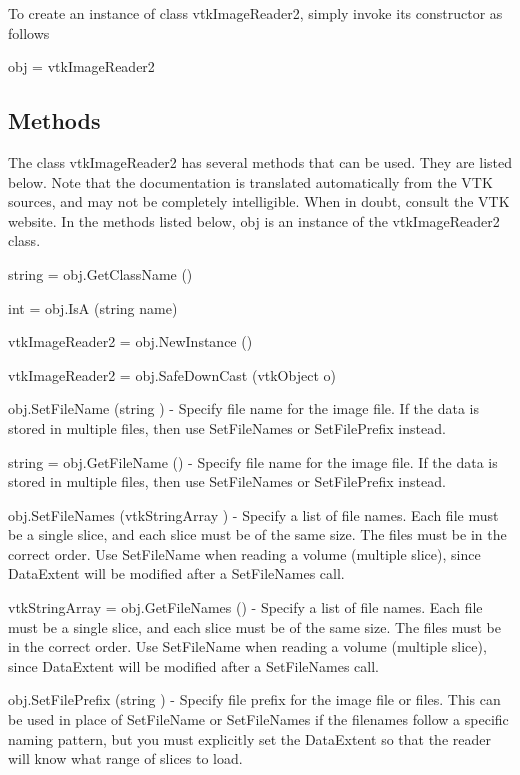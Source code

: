 To create an instance of class vtk\-Image\-Reader2, simply invoke its constructor as follows \begin{DoxyVerb}  obj = vtkImageReader2
\end{DoxyVerb}
 \hypertarget{vtkwidgets_vtkxyplotwidget_Methods}{}\subsection{Methods}\label{vtkwidgets_vtkxyplotwidget_Methods}
The class vtk\-Image\-Reader2 has several methods that can be used. They are listed below. Note that the documentation is translated automatically from the V\-T\-K sources, and may not be completely intelligible. When in doubt, consult the V\-T\-K website. In the methods listed below, {\ttfamily obj} is an instance of the vtk\-Image\-Reader2 class. 
\begin{DoxyItemize}
\item {\ttfamily string = obj.\-Get\-Class\-Name ()}  
\item {\ttfamily int = obj.\-Is\-A (string name)}  
\item {\ttfamily vtk\-Image\-Reader2 = obj.\-New\-Instance ()}  
\item {\ttfamily vtk\-Image\-Reader2 = obj.\-Safe\-Down\-Cast (vtk\-Object o)}  
\item {\ttfamily obj.\-Set\-File\-Name (string )} -\/ Specify file name for the image file. If the data is stored in multiple files, then use Set\-File\-Names or Set\-File\-Prefix instead.  
\item {\ttfamily string = obj.\-Get\-File\-Name ()} -\/ Specify file name for the image file. If the data is stored in multiple files, then use Set\-File\-Names or Set\-File\-Prefix instead.  
\item {\ttfamily obj.\-Set\-File\-Names (vtk\-String\-Array )} -\/ Specify a list of file names. Each file must be a single slice, and each slice must be of the same size. The files must be in the correct order. Use Set\-File\-Name when reading a volume (multiple slice), since Data\-Extent will be modified after a Set\-File\-Names call.  
\item {\ttfamily vtk\-String\-Array = obj.\-Get\-File\-Names ()} -\/ Specify a list of file names. Each file must be a single slice, and each slice must be of the same size. The files must be in the correct order. Use Set\-File\-Name when reading a volume (multiple slice), since Data\-Extent will be modified after a Set\-File\-Names call.  
\item {\ttfamily obj.\-Set\-File\-Prefix (string )} -\/ Specify file prefix for the image file or files. This can be used in place of Set\-File\-Name or Set\-File\-Names if the filenames follow a specific naming pattern, but you must explicitly set the Data\-Extent so that the reader will know what range of slices to load.  

\end{DoxyItemize}
